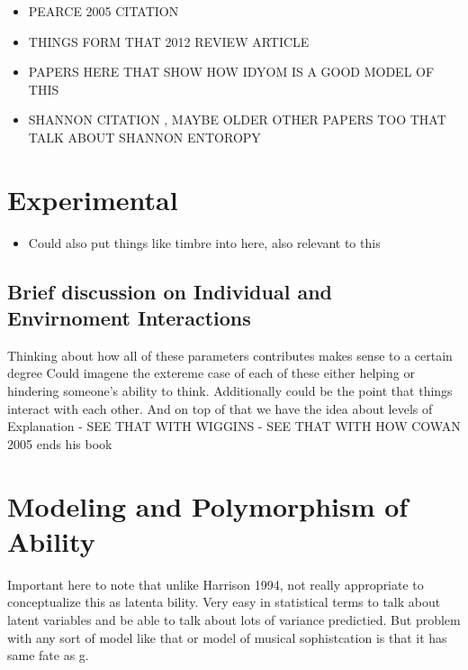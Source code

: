 \documentclass[]{book}
\providecommand{\tightlist}{%
  \setlength{\itemsep}{0pt}\setlength{\parskip}{0pt}}
\theoremstyle{definition}
\theoremstyle{definition}
\theoremstyle{definition}
\theoremstyle{remark}
\begin{document}
\begin{itemize}
\tightlist
\item
  PEARCE 2005 CITATION
\item
  THINGS FORM THAT 2012 REVIEW ARTICLE
\item
  PAPERS HERE THAT SHOW HOW IDYOM IS A GOOD MODEL OF THIS
\item
  SHANNON CITATION , MAYBE OLDER OTHER PAPERS TOO THAT TALK ABOUT
  SHANNON ENTOROPY
\end{itemize}

\hypertarget{experimental}{%
\section{Experimental}\label{experimental}}

\begin{itemize}
\tightlist
\item
  Could also put things like timbre into here, also relevant to this
\end{itemize}

\hypertarget{brief-discussion-on-individual-and-envirnoment-interactions}{%
\subsection{Brief discussion on Individual and Envirnoment
Interactions}\label{brief-discussion-on-individual-and-envirnoment-interactions}}

Thinking about how all of these parameters contributes makes sense to a
certain degree Could imagene the extereme case of each of these either
helping or hindering someone's ability to think. Additionally could be
the point that things interact with each other. And on top of that we
have the idea about levels of Explanation - SEE THAT WITH WIGGINS - SEE
THAT WITH HOW COWAN 2005 ends his book

\hypertarget{modeling-and-polymorphism-of-ability}{%
\section{Modeling and Polymorphism of
Ability}\label{modeling-and-polymorphism-of-ability}}

Important here to note that unlike Harrison 1994, not really appropriate
to conceptualize this as latenta bility. Very easy in statistical terms
to talk about latent variables and be able to talk about lots of
variance predictied. But problem with any sort of model like that or
model of musical sophistcation is that it has same fate as g.
\end{document}
